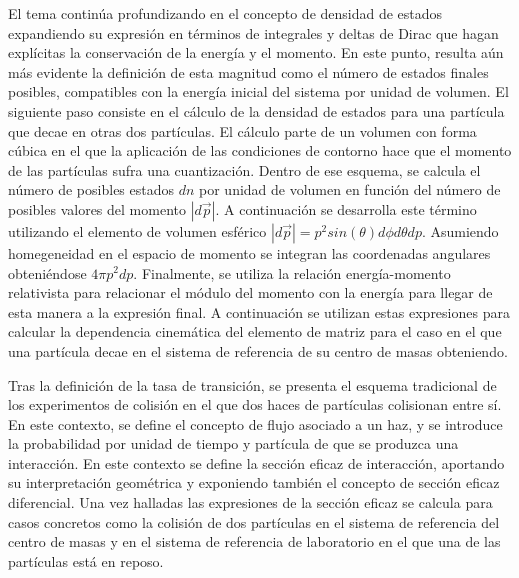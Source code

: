 El tema continúa profundizando en el concepto de densidad de estados expandiendo su expresión en términos de integrales y deltas de Dirac que hagan explícitas la conservación de la energía y el momento. En este punto, resulta aún más evidente la definición de esta magnitud como el número de estados finales posibles, compatibles con la energía inicial del sistema por unidad de volumen. El siguiente paso consiste en el cálculo de la densidad de estados para una partícula que decae en otras dos partículas. El cálculo parte de un volumen con forma cúbica en el que la aplicación de las condiciones de contorno hace que el momento de las partículas sufra una cuantización. Dentro de ese esquema, se calcula el número de posibles estados $dn$ por unidad de volumen en función del número de posibles valores del momento $|d\vec{p}|$. A continuación se desarrolla este término utilizando el elemento de volumen esférico $|d\vec{p}|=p^2sin(\theta)d\phi d\theta dp$. Asumiendo homegeneidad en el espacio de momento se integran las coordenadas angulares obteniéndose $4\pi p^2dp$. Finalmente, se utiliza la relación energía-momento relativista para relacionar el módulo del momento con la energía para llegar de esta manera a la expresión final. A continuación se utilizan estas expresiones para calcular la dependencia cinemática del elemento de matriz para el caso en el que una partícula decae en el sistema de referencia de su centro de masas obteniendo. 

Tras la definición de la tasa de transición, se presenta el esquema tradicional de los experimentos de colisión en el que dos haces de partículas colisionan entre sí. En este contexto, se define el concepto de flujo asociado a un haz, y se introduce la probabilidad por unidad de tiempo y partícula de que se produzca una interacción. En este contexto se define la sección eficaz de interacción, aportando su interpretación geométrica y exponiendo también el concepto de sección eficaz diferencial. Una vez halladas las expresiones de la sección eficaz se calcula para casos concretos como la colisión de dos partículas en el sistema de referencia del centro de masas y en el sistema de referencia de laboratorio en el que una de las partículas está en reposo.  

